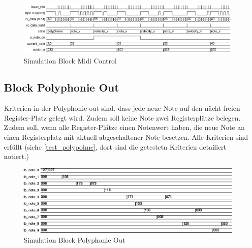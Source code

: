 \begin{figure}[H]
	\includegraphics[width=1\textwidth]{images/midi_control/wave_polyphonie.png}
	\caption{Simulation Block Midi Control}
	\label{fig.test_midi:control}
\end{figure} 

\subsection{Block Polyphonie Out}
Kriterien in der Polyphonie out sind, dass jede neue Note auf den nächt freien Register-Platz gelegt wird. Zudem soll keine Note zwei Registerplätze belegen. Zudem soll, wenn alle Register-Plätze einen Notenwert haben, die neue Note an einen Registerplatz mit aktuell abgeschaltener Note besetzen.
Alle Kriterien sind erfüllt (siehe \ref {test_polypohne}, dort sind die getestetn Kriterien detailiert notiert.)\\

\begin{figure}[H]
	\includegraphics[width=1\textwidth]{images/midi_interface/tb_polyphonie.png}
	\caption{Simulation Block Polyphonie Out}
	\label{fig.test_polyphonie}
\end{figure} 

